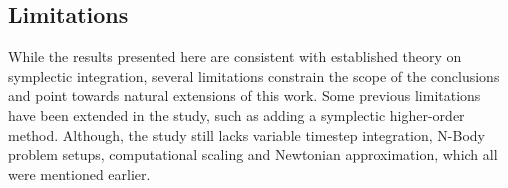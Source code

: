 \subsection{Limitations}

While the results presented here are consistent with established theory on symplectic integration, several
limitations constrain the scope of the conclusions and point towards natural extensions of this work.
Some previous limitations have been extended in the study, such as adding a symplectic higher-order method.
Although, the study still lacks variable timestep integration, N-Body problem setups, computational scaling
and Newtonian approximation, which all were mentioned earlier.